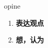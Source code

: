 
\begin{frame}
{\huge opine}
\begin{center}
\begin{enumerate}\Large
  \item \textbf{表达观点}
  \item \textbf{想，认为}
\end{enumerate}
\end{center}
\end{frame}
